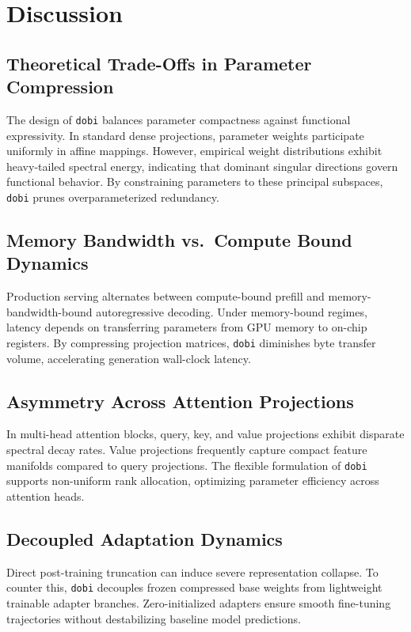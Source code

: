 \section{Discussion}

\subsection{Theoretical Trade-Offs in Parameter Compression}
The design of \texttt{dobi} balances parameter compactness against functional expressivity. In standard dense projections, parameter weights participate uniformly in affine mappings. However, empirical weight distributions exhibit heavy-tailed spectral energy, indicating that dominant singular directions govern functional behavior. By constraining parameters to these principal subspaces, \texttt{dobi} prunes overparameterized redundancy.

\subsection{Memory Bandwidth vs.\ Compute Bound Dynamics}
Production serving alternates between compute-bound prefill and memory-bandwidth-bound autoregressive decoding. Under memory-bound regimes, latency depends on transferring parameters from GPU memory to on-chip registers. By compressing projection matrices, \texttt{dobi} diminishes byte transfer volume, accelerating generation wall-clock latency.

\subsection{Asymmetry Across Attention Projections}
In multi-head attention blocks, query, key, and value projections exhibit disparate spectral decay rates. Value projections frequently capture compact feature manifolds compared to query projections. The flexible formulation of \texttt{dobi} supports non-uniform rank allocation, optimizing parameter efficiency across attention heads.

\subsection{Decoupled Adaptation Dynamics}
Direct post-training truncation can induce severe representation collapse. To counter this, \texttt{dobi} decouples frozen compressed base weights from lightweight trainable adapter branches. Zero-initialized adapters ensure smooth fine-tuning trajectories without destabilizing baseline model predictions.

